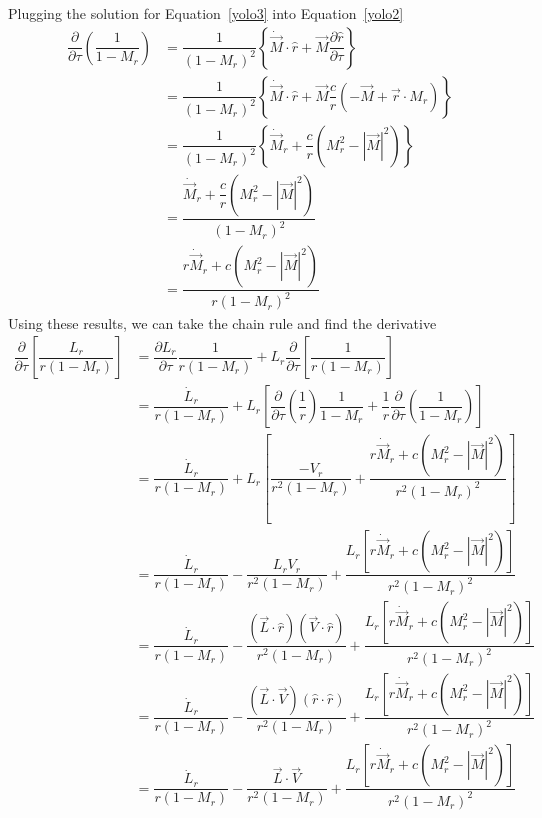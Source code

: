 \documentclass[onecolumn,10pt]{jhwhw}
\begin{document}
Plugging the solution for Equation~\ref{yolo3} into Equation~\ref{yolo2}
\begin{align*}
\dfrac{\partial}{\partial\tau} \left( \dfrac{1}{1 - M_r} \right)
&= \dfrac{1}{(1 - M_r)^2} \left \{ \dot{\vec{M}}\cdot\hat{r} + \vec{M} \dfrac{\partial\hat{r}}{\partial\tau} \right \} \\
&= \dfrac{1}{(1 - M_r)^2} \left \{ \dot{\vec{M}}\cdot\hat{r} + \vec{M} \dfrac{c}{r} \left( -\vec{M} + \vec{r} \cdot M_r \right) \right \} \\
&= \dfrac{1}{(1 - M_r)^2} \left \{ \dot{\vec{M}}_r +\dfrac{c}{r}\left( M_r^2 -|\vec{M}|^2  \right) \right \} \\
&= \dfrac{ \dot{\vec{M}}_r + \dfrac{c}{r} \left( M_r^2 -|\vec{M}|^2  \right) } {(1 - M_r)^2} \\
&= \dfrac{ r\dot{\vec{M}}_r + c \left( M_r^2 - |\vec{M}|^2 \right) } {r (1 - M_r)^2}
\end{align*}
Using these results, we can take the chain rule and find the derivative
\begin{align}
\dfrac{\partial}{\partial \tau} \left[ \dfrac{L_r}{r (1 - M_r)} \right]
& = \dfrac{\partial L_r}{\partial \tau} \dfrac{1}{r (1 - M_r)}
    + L_r\dfrac{\partial}{\partial \tau} \left[ \dfrac{1}{r (1 - M_r)} \right] \nonumber \\
& = \dfrac{\dot{L}_r}{r (1 - M_r)}
    + L_r \left[
    \dfrac{\partial}{\partial\tau} \left(\dfrac{1}{r}\right) \dfrac{1}{1 - M_r}
    + \dfrac{1}{r} \dfrac{\partial}{\partial\tau} \left(\dfrac{1}{1-M_r}\right)
    \right] \nonumber \\
& = \dfrac{\dot{L}_r}{r (1 - M_r)}
    + L_r \left[
    \dfrac{-V_r}{r^2 (1 - M_r)}
    + \dfrac{ r\dot{\vec{M}}_r + c \left( M_r^2 - |\vec{M}|^2 \right) }
        {r^2 (1 - M_r)^2}
    \right] \nonumber \\
&= \dfrac{\dot{L}_r}{r (1 - M_r)}
    - \dfrac{L_r V_r}{r^2 (1 - M_r)}
    + \dfrac{ L_r \left[
        r\dot{\vec{M}}_r + c \left( M_r^2 - |\vec{M}|^2 \right) \right] }
        {r^2 (1 - M_r)^2} \nonumber \\
&= \dfrac{\dot{L}_r}{r (1 - M_r)}
    - \dfrac{(\vec{L}\cdot\hat{r}) (\vec{V}\cdot\hat{r})}{r^2 (1 - M_r)}
    + \dfrac{ L_r \left[
        r\dot{\vec{M}}_r + c \left( M_r^2 - |\vec{M}|^2 \right) \right] }
        {r^2 (1 - M_r)^2} \nonumber \\
&= \dfrac{\dot{L}_r}{r (1 - M_r)}
    - \dfrac{(\vec{L}\cdot\vec{V}) (\hat{r}\cdot\hat{r})}{r^2 (1 - M_r)}
    + \dfrac{ L_r \left[
        r\dot{\vec{M}}_r + c \left( M_r^2 - |\vec{M}|^2 \right) \right] }
        {r^2 (1 - M_r)^2} \nonumber \\
&= \dfrac{\dot{L}_r}{r (1 - M_r)}
    - \dfrac{\vec{L}\cdot\vec{V}}{r^2 (1 - M_r)}
    + \dfrac{ L_r \left[
        r\dot{\vec{M}}_r + c \left( M_r^2 - |\vec{M}|^2 \right) \right] }
        {r^2 (1 - M_r)^2} \label{yolo_swag}
\end{align}
\end{document}
